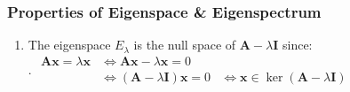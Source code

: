 \subsubsection{Properties of Eigenspace \& Eigenspectrum}

\begin{enumerate}
    \item The eigenspace $E_\lambda$  is the null space of $\bm{A} - \lambda \bm{I}$ since:
    \hfill \cite{mfml/book/mml/Deisenroth-Faisal-Ong}
    \\
    .\hfill
    $
        \begin{aligned}
            \bm{Ax} = \lambda \bm{x}
            & \Longleftrightarrow \bm{Ax} - \lambda \bm{x} = 0 \\
            & \Longleftrightarrow (\bm{A} - \lambda \bm{I})\bm{x} = 0  
            & \Longleftrightarrow \bm{x} \in \ker(\bm{A} - \lambda \bm{I})
        \end{aligned}
    $
    \hfill \cite{mfml/book/mml/Deisenroth-Faisal-Ong}
\end{enumerate}






